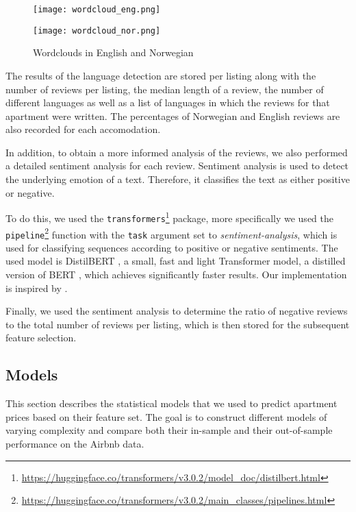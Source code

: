 \begin{figure}[t]
  \centering
  \begin{minipage}{6.7cm}
    \texttt{[image: wordcloud\_eng.png]}
  \end{minipage}
  \begin{minipage}{6.7cm}
    \texttt{[image: wordcloud\_nor.png]}
  \end{minipage}
  \caption{Wordclouds in English and Norwegian}
  \label{fig:wordclouds}
\end{figure}

The results of the language detection are stored per listing along with the number of reviews per listing, the median length of a review, the number of different languages as well as a list of languages in which the reviews for that apartment were written.
The percentages of Norwegian and English reviews are also recorded for each accomodation.

In addition, to obtain a more informed analysis of the reviews, we also performed a detailed sentiment analysis for each review.
Sentiment analysis is used to detect the underlying emotion of a text.
Therefore, it classifies the text as either positive or negative.

To do this, we used the \texttt{transformers}\footnote{\url{https://huggingface.co/transformers/v3.0.2/model_doc/distilbert.html}} package, more specifically we used the \texttt{pipeline}\footnote{\url{https://huggingface.co/transformers/v3.0.2/main_classes/pipelines.html}} function with the \texttt{task} argument set to \textit{sentiment-analysis}, which is used for classifying sequences according to positive or negative sentiments.
The used model is DistilBERT \citep{sanh2020}, a small, fast and light Transformer model, a distilled version of BERT \citep{devlin2019}, which achieves significantly faster results.
Our implementation is inspired by \citep{selvaraj2020}.

Finally, we used the sentiment analysis to determine the ratio of negative reviews to the total number of reviews per listing, which is then stored for the subsequent feature selection.


\subsection{Models}

This section describes the statistical models that we used to predict apartment prices based on their feature set.
The goal is to construct different models of varying complexity and compare both their in-sample and their out-of-sample performance on the Airbnb data.

